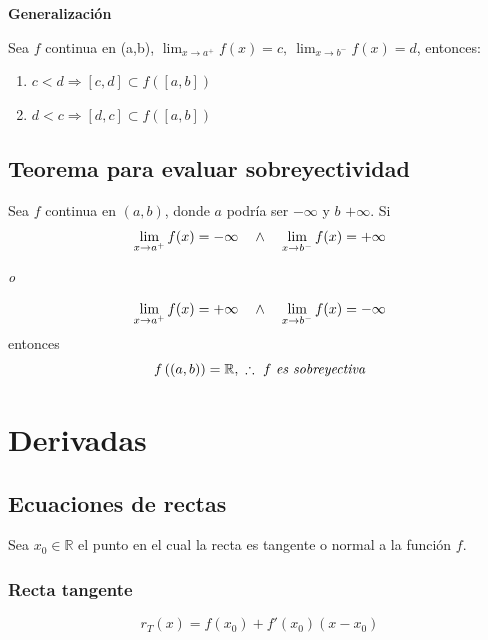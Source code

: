 \documentclass[11pt,titlepage]{article}
\newcommand{\commLim}[2]{\lim_{#1 \to #2}}
\newcommand{\displayLim}[2]{\displaystyle \commLim{#1}{#2}}
\newcommand{\littleTitle}[1]{
	\noindent \ignorespaces
	\small \textbf{#1} \normalsize
	\ignorespaces \ignorespacesafterend
}
\begin{document}
\littleTitle{Generalización}\par
Sea $f$ continua en (a,b), $\commLim{x}{a^{+}} f(x) = c, \ \commLim{x}{b^{-}} f(x) = d$, entonces:
\begin{enumerate}[label=\alph*.]
	\item $c < d \Rightarrow [c,d] \subset f\left([a,b]\right)$
	\item $d < c \Rightarrow [d,c] \subset f\left([a,b]\right)$
\end{enumerate}

\pagebreak

\subsection{Teorema para evaluar sobreyectividad}
Sea $f$ continua en $(a,b)$, donde $a$ podría ser $-\infty$ y $b$ $+\infty$. Si
\begin{equation*}
	\commLim{x}{a^{+}} f(x) = -\infty \quad \wedge \quad \displayLim{x}{b^{-}} f(x) = +\infty \\
\end{equation*}
\begin{center}
\Large{\emph{o}}
\end{center}
\begin{equation*}
	\commLim{x}{a^{+}} f(x) = +\infty \quad \wedge \quad \displayLim{x}{b^{-}} f(x) = -\infty \\
\end{equation*}
entonces
\begin{equation*}
	f\left((a,b)\right) = \mathbb{R}, \ \therefore \ f \ \text{\emph{es sobreyectiva}}
\end{equation*}


\vspace{1cm}
\section{Derivadas}

\subsection{Ecuaciones de rectas}
Sea $x_0 \in \mathbb{R}$ el punto en el cual la recta es tangente o normal a la función $f$.
\subsubsection{Recta tangente}
\begin{equation}
	r_{T}(x) = f(x_0) + f'(x_0)(x - x_0)
\end{equation}
\end{document}

